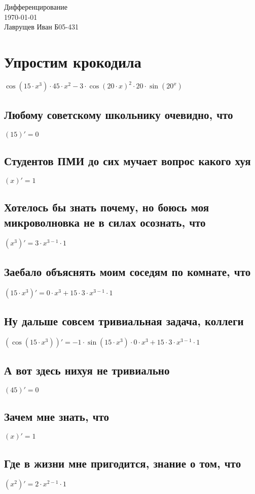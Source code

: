 \documentclass[12pt]{article}
\begin{document}
\begingroup
    \centering
    \LARGE Дифференцирование\\
    \large \today \\[0.5em]
    \large Лаврущев Иван Б05-431\par
\endgroup

\tableofcontents

\section{Упростим крокодила}
\LARGE $\cos(15 \cdot x^{3}) \cdot 45 \cdot x^{2} - 3 \cdot \cos(20 \cdot x)^{2} \cdot 20 \cdot \sin(20^{x})$
\normalsize
\subsection{Любому советскому школьнику очевидно, что}
$(15)' = 0$
\subsection{Студентов ПМИ до сих мучает вопрос какого хуя}
$(x)' = 1$
\subsection{Хотелось бы знать почему, но боюсь моя микроволновка не в силах осознать, что}
$(x^{3})' = 3 \cdot x^{3 - 1} \cdot 1$
\subsection{Заебало объяснять моим соседям по комнате, что}
$(15 \cdot x^{3})' = 0 \cdot x^{3} + 15 \cdot 3 \cdot x^{3 - 1} \cdot 1$
\subsection{Ну дальше совсем тривиальная задача, коллеги}
$(\cos(15 \cdot x^{3}))' = -1 \cdot \sin(15 \cdot x^{3}) \cdot 0 \cdot x^{3} + 15 \cdot 3 \cdot x^{3 - 1} \cdot 1$
\subsection{А вот здесь нихуя не тривиально}
$(45)' = 0$
\subsection{Зачем мне знать, что}
$(x)' = 1$
\subsection{Где в жизни мне пригодится, знание о том, что}
$(x^{2})' = 2 \cdot x^{2 - 1} \cdot 1$
\end{document}

